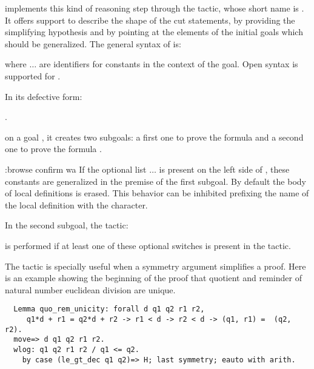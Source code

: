 \ssr{} implements this kind of reasoning step through the 
tactic, whose short name is . It offers support to describe
the shape of the cut statements, by providing the simplifying
hypothesis and by pointing at the elements of the initial goals which
should be generalized. The general syntax of  is:

\begin{center}
      \ssrC{:}  \ssrC{/} {\term}
\end{center}

where  $\dots$  are identifiers for constants
in the context of the goal. Open syntax is supported for {\term}.

In its defective form:

\begin{center}
   {\term}.
\end{center}

on a goal , it creates two subgoals: a first one to prove the formula
\ssrC{(}{\term}  and a second one to prove the formula
{\term} .

:browse confirm wa
If the optional list  $\dots$  is present on the left
side of \ssrC{/}, these constants are generalized in the premise
\ssrC{(}{\term}  of the first subgoal. By default the body of
local definitions  is erased. This behavior can be inhibited
prefixing the name of the local definition with the  character.

In the second subgoal, the tactic:

\begin{center}
   \ssrC{} 
\end{center}

is performed if at least one of these optional switches is present in
the  tactic.

The  tactic is specially useful when a symmetry argument
simplifies a proof. Here is an example showing the beginning of the
proof that quotient and reminder of natural number euclidean division
are unique.
\begin{lstlisting}
  Lemma quo_rem_unicity: forall d q1 q2 r1 r2,
     q1*d + r1 = q2*d + r2 -> r1 < d -> r2 < d -> (q1, r1) =  (q2, r2).
  move=> d q1 q2 r1 r2.
  wlog: q1 q2 r1 r2 / q1 <= q2.
    by case (le_gt_dec q1 q2)=> H; last symmetry; eauto with arith.
\end{lstlisting}

